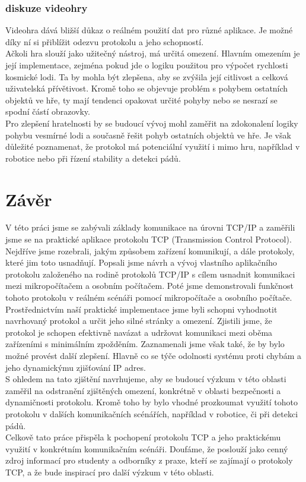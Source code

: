\documentclass[12pt]{report}			%
\begin{document}
\subsection{diskuze videohry}

Videohra dává bližší důkaz o reálném použití dat pro různé aplikace. Je možné díky ní si přiblížit odezvu protokolu a jeho schopností. 
\\
Ačkoli hra slouží jako užitečný nástroj, má určitá omezení. Hlavním omezením je její implementace, zejména pokud jde o logiku použitou pro výpočet rychlosti kosmické lodi. Ta by mohla být zlepšena, aby se zvýšila její citlivost a celková uživatelská přívětivost. Kromě toho se objevuje problém s pohybem ostatních objektů ve hře, ty mají tendenci opakovat určité pohyby nebo se nesrazí se spodní částí obrazovky.
\\
Pro zlepšení hratelnosti by se budoucí vývoj mohl zaměřit na zdokonalení logiky pohybu vesmírné lodi a současně řešit pohyb ostatních objektů ve hře. Je však důležité poznamenat, že protokol má potenciální využití i mimo hru, například v robotice nebo při řízení stability a detekci pádů.



	\chapter*{Závěr}
	
		V této práci jsme se zabývali základy komunikace na úrovni TCP/IP a zaměřili jsme se na praktické aplikace protokolu TCP (Transmission Control Protocol). Nejdříve jsme rozebrali, jakým způsobem zařízení komunikují, a dále protokoly, které jim toto usnadňují. Popsali jsme návrh a vývoj vlastního aplikačního protokolu založeného na rodině protokolů TCP/IP s cílem usnadnit komunikaci mezi mikropočítačem a osobním počítačem. Poté jsme demonstrovali funkčnost tohoto protokolu v reálném scénáři pomocí mikropočítače a osobního počítače.
\\
Prostřednictvím naší praktické implementace jsme byli schopni vyhodnotit navrhovaný protokol a určit jeho silné stránky a omezení. Zjistili jsme, že protokol je schopen efektivně navázat a udržovat komunikaci mezi oběma zařízeními s minimálním zpožděním. Zaznamenali jsme však také, že by bylo možné provést další zlepšení. Hlavně co se týče odolnosti systému proti chybám a jeho dynamickýmu zjišťování IP adres.  
\\
S ohledem na tato zjištění navrhujeme, aby se budoucí výzkum v této oblasti zaměřil na odstranění zjištěných omezení, konkrétně v oblasti bezpečnosti a dynamičnosti protokolu. Kromě toho by bylo vhodné prozkoumat využití tohoto protokolu v dalších komunikačních scénářích, například v robotice, či při detekci pádů.
\\
Celkově tato práce přispěla k pochopení protokolu TCP a jeho praktickému využití v konkrétním komunikačním scénáři. Doufáme, že poslouží jako cenný zdroj informací pro studenty a odborníky z praxe, kteří se zajímají o protokoly TCP, a že bude inspirací pro další výzkum v této oblasti.
	
\end{document}
